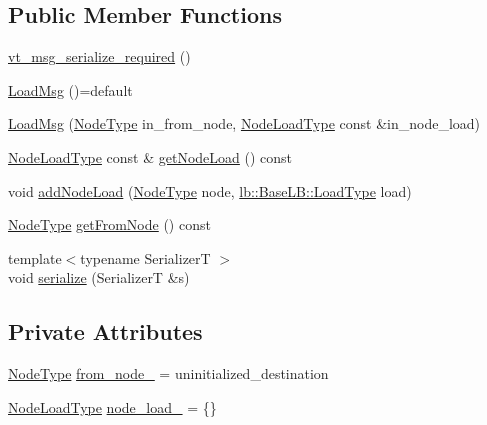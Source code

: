 \subsection*{Public Member Functions}
\begin{DoxyCompactItemize}
\item 
\hyperlink{structvt_1_1vrt_1_1collection_1_1balance_1_1_load_msg_a7af4e3144817b0517e51d9822d8fffbb}{vt\+\_\+msg\+\_\+serialize\+\_\+required} ()
\item 
\hyperlink{structvt_1_1vrt_1_1collection_1_1balance_1_1_load_msg_a1b1079cba829ea2b6550b23ca0291c6f}{Load\+Msg} ()=default
\item 
\hyperlink{structvt_1_1vrt_1_1collection_1_1balance_1_1_load_msg_a8efcccdd438315320ef290e81d0e6884}{Load\+Msg} (\hyperlink{namespacevt_a866da9d0efc19c0a1ce79e9e492f47e2}{Node\+Type} in\+\_\+from\+\_\+node, \hyperlink{structvt_1_1vrt_1_1collection_1_1balance_1_1_load_msg_a65e300c2d6119d11e9121b17f7f94850}{Node\+Load\+Type} const \&in\+\_\+node\+\_\+load)
\item 
\hyperlink{structvt_1_1vrt_1_1collection_1_1balance_1_1_load_msg_a65e300c2d6119d11e9121b17f7f94850}{Node\+Load\+Type} const  \& \hyperlink{structvt_1_1vrt_1_1collection_1_1balance_1_1_load_msg_a736ae1674935e332f1e9827f8496707c}{get\+Node\+Load} () const
\item 
void \hyperlink{structvt_1_1vrt_1_1collection_1_1balance_1_1_load_msg_a59a33d9ef1dfe4616d701036e0c39ab9}{add\+Node\+Load} (\hyperlink{namespacevt_a866da9d0efc19c0a1ce79e9e492f47e2}{Node\+Type} node, \hyperlink{structvt_1_1vrt_1_1collection_1_1lb_1_1_base_l_b_a215e22b9f12678303f49615ae3be05cc}{lb\+::\+Base\+L\+B\+::\+Load\+Type} load)
\item 
\hyperlink{namespacevt_a866da9d0efc19c0a1ce79e9e492f47e2}{Node\+Type} \hyperlink{structvt_1_1vrt_1_1collection_1_1balance_1_1_load_msg_ab9a7c49ba4e6f57db8f2f912f1f3e024}{get\+From\+Node} () const
\item 
{\footnotesize template$<$typename SerializerT $>$ }\\void \hyperlink{structvt_1_1vrt_1_1collection_1_1balance_1_1_load_msg_a41cb0f33effbb6fa7c9306367ef45de9}{serialize} (SerializerT \&s)
\end{DoxyCompactItemize}
\subsection*{Private Attributes}
\begin{DoxyCompactItemize}
\item 
\hyperlink{namespacevt_a866da9d0efc19c0a1ce79e9e492f47e2}{Node\+Type} \hyperlink{structvt_1_1vrt_1_1collection_1_1balance_1_1_load_msg_a0f4e4ee3be0ec523e6bebe15ddcd3459}{from\+\_\+node\+\_\+} = uninitialized\+\_\+destination
\item 
\hyperlink{structvt_1_1vrt_1_1collection_1_1balance_1_1_load_msg_a65e300c2d6119d11e9121b17f7f94850}{Node\+Load\+Type} \hyperlink{structvt_1_1vrt_1_1collection_1_1balance_1_1_load_msg_afdbf7d2d139d40c8e04958d2c02bb94d}{node\+\_\+load\+\_\+} = \{\}
\end{DoxyCompactItemize}
